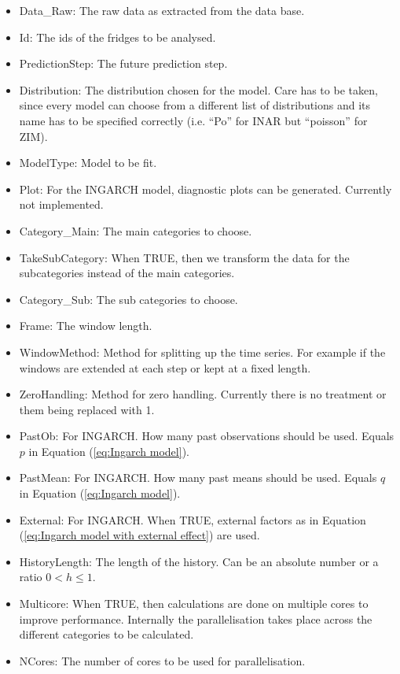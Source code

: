 \begin{itemize}
	\item Data\_Raw: The raw data as extracted from the data base.
  \item Id: The ids of the fridges to be analysed.
  \item PredictionStep: The future prediction step.
  \item Distribution: The distribution chosen for the model. Care has to be taken, since every model can choose from a different list of distributions and its name has to be specified correctly (i.e. "`Po"' for INAR but "`poisson"' for ZIM).
  \item ModelType: Model to be fit. 
  \item Plot: For the INGARCH model, diagnostic plots can be generated. Currently not implemented.
  \item Category\_Main: The main categories to choose. 
  \item TakeSubCategory: When TRUE, then we transform the data for the subcategories instead of the main categories. 
  \item Category\_Sub: The sub categories to choose.
  \item Frame: The window length.
  \item WindowMethod: Method for splitting up the time series. For example if the windows are extended at each step or kept at a fixed length.
  \item ZeroHandling: Method for zero handling. Currently there is no treatment or them being replaced with 1. 
  \item PastOb: For INGARCH. How many past observations should be used. Equals $p$ in Equation (\ref{eq:Ingarch model}).
  \item PastMean: For INGARCH. How many past means should be used. Equals $q$ in Equation (\ref{eq:Ingarch model}).
  \item External: For INGARCH. When TRUE, external factors as in Equation (\ref{eq:Ingarch model with external effect}) are used.
  \item HistoryLength: The length of the history. Can be an absolute number or a ratio $0<h\leq 1$.
  \item Multicore: When TRUE, then calculations are done on multiple cores to improve performance. Internally the parallelisation takes place across the different categories to be calculated. 
  \item NCores: The number of cores to be used for parallelisation. 
\end{itemize}

